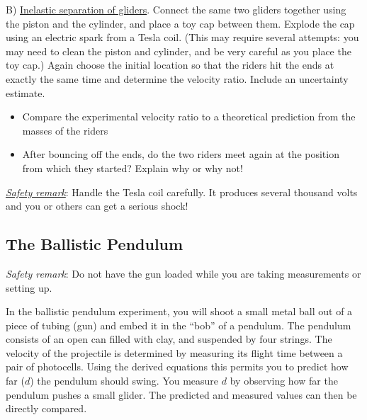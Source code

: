 B) \underline{Inelastic separation of gliders}. Connect the same two gliders together using the piston and the cylinder, and place a toy cap between them. Explode the cap using an electric spark from a Tesla coil. (This may require several attempts: you may need to clean the piston and cylinder, and be very careful as you place the toy cap.)  Again choose the initial location so that the riders hit the ends at exactly the same time and determine the velocity ratio. Include an uncertainty estimate.
\begin{itemize}
\item Compare the experimental velocity ratio to a theoretical prediction from the masses of the riders
\item After bouncing off the ends, do the two riders meet again at the position from which they started?  Explain why or why not!
\end{itemize}

\underline{\emph{Safety remark}}: Handle the Tesla coil carefully. It produces several thousand volts and you or others can get a serious shock! 

\subsection{The Ballistic Pendulum}
\emph{Safety remark}: Do not have the gun loaded while you are taking measurements or setting up.\myskip

In the ballistic pendulum experiment, you will shoot a small metal ball out of a piece of tubing (gun) and embed it in the ``bob'' of a pendulum. The pendulum consists of an open can filled with clay, and suspended by four strings. The velocity of the projectile is determined by measuring its flight time between a pair of photocells. Using the derived equations this permits you to predict how far ($d$) the pendulum should swing. You measure $d$ by observing how far the pendulum pushes a small glider. The predicted and measured values can then be directly compared.\myskip

